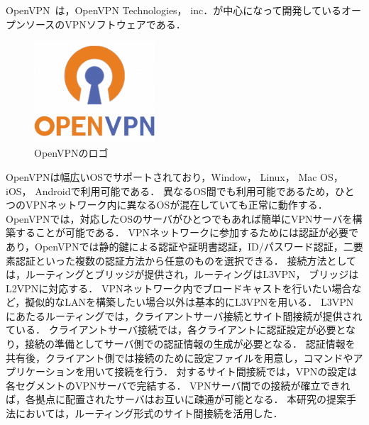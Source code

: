 OpenVPN~\cite{OpenVPN}は，OpenVPN Technologies， inc．が中心になって開発しているオープンソースのVPNソフトウェアである．

\begin{figure}[htbp]
\begin{center}
    \includegraphics[width=0.4\textwidth]{./figures/openvpn-logo.png}
    \caption{OpenVPNのロゴ}
\end{center}
\end{figure}

OpenVPNは幅広いOSでサポートされており，Window， Linux， Mac OS， iOS， Androidで利用可能である．
異なるOS間でも利用可能であるため，ひとつのVPNネットワーク内に異なるOSが混在していても正常に動作する．
OpenVPNでは，対応したOSのサーバがひとつでもあれば簡単にVPNサーバを構築することが可能である．
VPNネットワークに参加するためには認証が必要であり，OpenVPNでは静的鍵による認証や証明書認証，ID/パスワード認証，二要素認証といった複数の認証方法から任意のものを選択できる．
接続方法としては，ルーティングとブリッジが提供され，ルーティングはL3VPN， ブリッジはL2VPNに対応する．
VPNネットワーク内でブロードキャストを行いたい場合など，擬似的なLANを構築したい場合以外は基本的にL3VPNを用いる．
L3VPNにあたるルーティングでは，クライアントサーバ接続とサイト間接続が提供されている．
クライアントサーバ接続では，各クライアントに認証設定が必要となり，接続の準備としてサーバ側での認証情報の生成が必要となる．
認証情報を共有後，クライアント側では接続のために設定ファイルを用意し，コマンドやアプリケーションを用いて接続を行う．
対するサイト間接続では，VPNの設定は各セグメントのVPNサーバで完結する．
VPNサーバ間での接続が確立できれば，各拠点に配置されたサーバはお互いに疎通が可能となる．
本研究の提案手法においては，ルーティング形式のサイト間接続を活用した．
